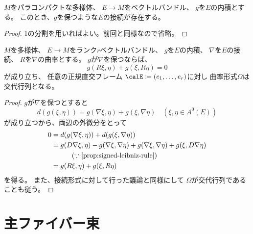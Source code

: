 \documentclass[report]{jlreq}
\begin{document}
\begin{proposition}[内積を保つ接続の存在]
    $M$をパラコンパクトな多様体、
    $E \to M$をベクトルバンドル、
    $g$を$E$の内積とする。
    このとき、$g$を保つような$E$の接続が存在する。
\end{proposition}

\begin{proof}
    1の分割を用いればよい。前回と同様なので省略。
\end{proof}

\begin{proposition}[曲率形式]
    $M$を多様体、
    $E \to M$をランク$r$ベクトルバンドル、
    $g$を$E$の内積、
    $\nabla$を$E$の接続、
    $R$を$\nabla$の曲率とする。
    $g$が$\nabla$を保つならば、
    \begin{equation}
        g(R\xi, \eta) + g(\xi, R\eta) = 0
    \end{equation}
    が成り立ち、
    任意の正規直交フレーム
    $\calE \coloneqq (e_1, \dots, e_r)$に対し
    曲率形式$\Omega$は交代行列となる。
\end{proposition}

\begin{proof}
    $g$が$\nabla$を保つとすると
    \begin{equation}
        d(g(\xi, \eta)) = g(\nabla \xi, \eta) + g(\xi, \nabla \eta)
            \quad (\xi, \eta \in A^0(E))
    \end{equation}
    が成り立つから、両辺の外微分をとって
    \begin{alignat}{1}
        0 &= d(g(\nabla \xi, \eta)) + d(g(\xi, \nabla \eta)) \\
            &= g(D\nabla \xi, \eta) - g(\nabla \xi, \nabla \eta)
                + g(\nabla \xi, \nabla \eta) + g(\xi, D\nabla \eta) \\
            &\qquad \quad (\text{$\because$ \cref{prop:signed-leibniz-rule}}) \\
            &= g(R \xi, \eta) + g(\xi, R \eta)
    \end{alignat}
    を得る。
    また、接続形式に対して行った議論と同様にして
    $\Omega$が交代行列であることも従う。
\end{proof}


%
\section{主ファイバー束}
\end{document}
